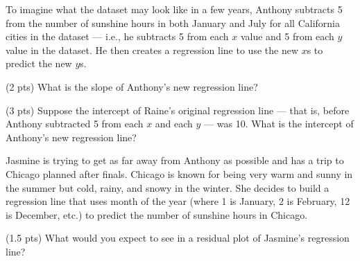 \begin{prob}[(11 pts)]
To imagine what the dataset may look like in a few years, Anthony subtracts 5 from the number of sunshine hours in both January and July for all California cities in the dataset --- i.e., he subtracts 5 from each $x$ value and 5 from each $y$ value in the dataset. He then creates a regression line to use the new $x$s to predict the new $y$s.

\begin{subprobset}

\begin{subprob}(2 pts) What is the slope of Anthony's new regression line?

\inlineresponsebox[2in]{}{}

\end{subprob}

\begin{subprob}(3 pts) Suppose the intercept of Raine's original regression line --- that is, before Anthony subtracted 5 from each $x$ and each $y$ --- was 10. What is the intercept of Anthony's new regression line?


\end{subprob}

\end{subprobset}

Jasmine is trying to get as far away from Anthony as possible and has a trip to Chicago planned after finals. Chicago is known for being very warm and sunny in the summer but cold, rainy, and snowy in the winter. She decides to build a regression line that uses month of the year (where 1 is January, 2 is February, 12 is December, etc.) to predict the number of sunshine hours in Chicago.

\begin{subprobset}

\begin{subprob}(1.5 pts) What would you expect to see in a residual plot of Jasmine's regression line?



    
\end{subprob}
    
\end{subprobset}

\end{prob}